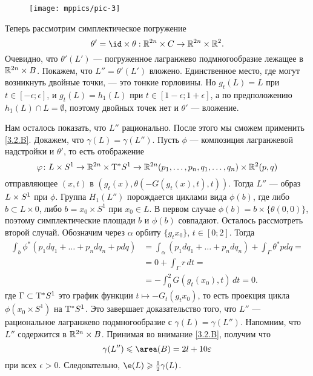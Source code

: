 \begin{figure}[ht!]
\vskip-0mm
\centering
\texttt{[image: mppics/pic-3]}
\caption{}\label{pic-3}
\vskip0mm
\end{figure}

Теперь рассмотрим симплектическое погружение 
\[\theta' = \id \times \theta: \RR^{2n} \times C \to \RR^{2n} \times \RR^2.\]
Очевидно, что $\theta' (L')$ --- погруженное лагранжево подмногообразие лежащее в $\mathbb{R}^{2n} \times B$. 
Покажем, что $L'' = \theta' (L')$ вложено.
Единственное место, где могут возникнуть двойные точки, --- это тонкие горловины.
Но $g_t (L) = L$ при $t \in [-\epsilon;\epsilon]$, 
и $g_t (L) = h_1 (L)$ при $t \in [1 - \epsilon;1 + \epsilon]$, а по предположению $h_1 (L) \cap L = \emptyset$, поэтому двойных точек нет и $\theta'$ --- вложение.

Нам осталось показать, что $L''$ рационально.
После этого мы сможем применить \ref{3.2.B}.
Докажем, что $\gamma (L) = \gamma (L'')$.
Пусть $\phi$ --- композиция лагранжевой надстройки и $\theta'$,
то есть отображение 
\[\varphi\colon 
L \times S^1
\to
\mathbb{R}^{2n} \times \mathrm{T}^\ast S^1
\to
\mathbb{R}^{2n} (p_1,\dots, p_n, q_1,\dots, q_n) \times \mathbb{R}^2 (p, q)\]
отправляющее $(x, t)$ в $(g_t (x), \theta (-G (g_t (x), t), t))$.
Тогда $L''$ --- образ $L \z\times S^1$ при $\phi$.
Группа $H_1 (L'')$ порождается циклами вида $\phi (b)$, где либо $b \subset L \times {0}$, либо $b = {x_0} \times S^1$ при $x_0 \in L$.
В первом случае $\phi (b) = b \times \{\theta (0, 0)\}$, поэтому симплектические площади $b$ и $\phi (b)$ совпадают.
Осталось рассмотреть второй случай.
Обозначим через $\alpha$ орбиту $\{g_t x_0\}$, $t \in [0; 2]$.
Тогда
\begin{align*}
\int_b\phi^\ast (p_1 dq_1 +\dots
+ p_n dq_n + pdq)
&= \int_\alpha (p_1 dq_1 +\dots
+ p_n dq_n) + \int_{\Gamma}\theta^\ast pdq =
\\
&= 0 + \int_{\Gamma} r\,dt =
\\
&= - \int_0^2G (g_t (x_0), t)\,dt 
= 0.
\end{align*}
где $\Gamma\subset \mathrm{T}^\ast S^{1}$ это график функции $t\mapsto -G_{t}(g_{t}x_{0})$, то есть проекция цикла $\phi(x_{0}\times S^{1})$ на $\mathrm{T}^\ast S^{1}$.
Это завершает доказательство того, что $L''$ --- рациональное лагранжево подмногообразие с $\gamma (L) = \gamma (L'')$.
Напомним, что $L''$ содержится в $\mathbb{R}^{2n} \times B$.
Принимая во внимание \ref{3.2.B}, получим что
\[\gamma (L'') \le \area (B) = 2l + 10\epsilon\]
при всех $\epsilon> 0$.
Следовательно, $\e(L) \ge \tfrac12 \gamma (L)$.
\qeds

